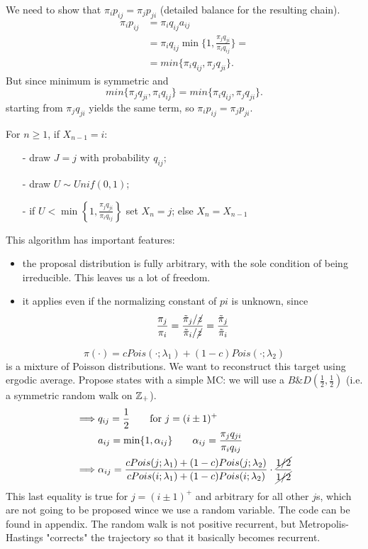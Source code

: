 \documentclass{article}
\begin{document}
\begin{proof2}
    We need to show that $\pi_ip_{ij}=\pi_jp_{ji}$ (detailed balance for the resulting chain).
        \begin{align*}
            \pi_ip_{ij}&=\pi_iq_{ij}a_{ij}\\
            &=\pi_iq_{ij}\min\bigg\{1,\frac{\pi_jq_{ji}}{\pi_iq_{ij}}\bigg\}=\\
            &=min\bigg\{\pi_iq_{ij},\pi_jq_{ji}\bigg\}.
        \end{align*}
        But since minimum is symmetric and \[
        min\big\{\pi_jq_{ji},\pi_iq_{ij}\big\}=min\big\{\pi_iq_{ij},\pi_jq_{ji}\big\}.
        \]
        starting from $\pi_jq_{ji}$ yields the same term, so $\pi_i p_{ij}=\pi_jp_{ji}$.
\end{proof2}
\begin{algorithm}
     For $n\geqslant1$, if $X_{n-1}=i$:
    \begin{itemize}
        \item [-] draw $J=j$ with probability $q_{ij}$;
        \item [-] draw $U\sim Unif(0,1)$;
        \item [-] if $U<\min\left\{1,\frac{\pi_jq_{ji}}{\pi_iq_{ij}}\right\}$ set $X_n=j$; else $X_n=X_{n-1}$
    \end{itemize}
\end{algorithm}
This algorithm has important features:
\begin{itemize}
    \item the proposal distribution is fully arbitrary, with the sole condition of being irreducible. This leaves us a lot of freedom.
    \item it applies even if the normalizing constant of $pi$ is unknown, since
    \[
    \frac{\pi_j}{\pi_i}=\frac{\tilde{\pi}_j/\cancel{z}}{\tilde{\pi}_i/\cancel{z}}=\frac{\tilde{\pi}_j}{\tilde{\pi}_i}
    \]
\end{itemize}
\begin{example}
    \[
\pi(\cdot)=cPois(\cdot;\lambda_1)+(1-c)Pois(\cdot;\lambda_2)
\]
is a mixture of Poisson distributions. We want to reconstruct this target using ergodic average. Propose states with a simple MC: we will use a $B\&D\left(\frac{1}{2},\frac{1}{2}\right)$ (i.e. a symmetric random walk on $\mathbb{Z}_+$).
\begin{align*}
    \implies &q_{ij}=\frac{1}{2}\qquad\text{for }j=(i\pm1)^+\\
    & a_{ij}=\min\{1,\alpha_{ij}\}\qquad\alpha_{ij}=\frac{\pi_jq_{ji}}{\pi_iq_{ij}}\\
    \implies &\alpha_{ij}=\frac{cPois(j;\lambda_1)+(1-c)Pois(j;\lambda_2)}{cPois(i;\lambda_1)+(1-c)Pois(i;\lambda_2)}\cdot\frac{\cancel{1/2}}{\cancel{1/2}}
\end{align*} This last equality is true for $j=(i\pm1)^+$ and arbitrary for all other $j$s, which are not going to be proposed wince we use a random variable. The code can be found in appendix. %
The random walk is not positive recurrent, but Metropolis-Hastings "corrects" the trajectory so that it basically becomes recurrent.
\end{example}
\end{document}
